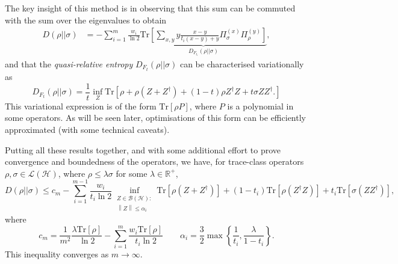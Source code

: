 \documentclass[10pt, a4paper]{article}
\numberwithin{equation}{section} %
\theoremstyle{definition}
\theoremstyle{plain}
\newcommand{\norm}[1]{\left\lVert#1\right\rVert}
\newcommand{\?}{\mathrel{?}} %
\newcommand{\R}{\mathbb{R}} %
\newcommand{\Tr}{\mathrm{Tr}} %
\newcommand{\Hs}{\mathcal{H}} %
\newcommand{\sB}{\mathcal{B}}
\begin{document}
      The key insight of this method is in observing that this sum can be commuted with the sum over the eigenvalues to obtain
      \begin{align}
        D(\rho||\sigma) &= - \sum_{i=1}^{m} \frac{w_i}{\ln 2} \underbrace{\Tr\left[ \sum_{x,y} y \frac{x-y}{t_i(x-y)+y} \Pi^{(x)}_{\sigma} \Pi^{(y)}_{\rho} \right]}_{D_{F_{t_i}}(\rho||\sigma)},
      \end{align}
      and that the \emph{quasi-relative entropy} \(D_{F_{t}}(\rho||\sigma)\) can be characterised variationally as
      \begin{equation}
        D_{F_{t}}(\rho||\sigma) = \frac{1}{t} \inf_Z \Tr\left[ \rho + \rho(Z + Z^{\dagger}) + (1-t)\rho{}Z^{\dagger}Z + t\sigma{}ZZ^{\dagger}. \right]
      \end{equation}
      This variational expression is of the form \(\Tr[\rho P]\), where \(P\) is a polynomial in some operators. As will be seen later, optimisations of this form can be efficiently approximated (with some technical caveats).

      Putting all these results together, and with some additional effort to prove convergence and boundedness of the operators, we have, for trace-class operators \(\rho, \sigma \in \mathcal{L}(\Hs)\), where \(\rho \leq \lambda\sigma\) for some \(\lambda \in \R^+\),
      \begin{equation}
        D(\rho||\sigma) \leq c_m - \sum_{i=1}^{m-1} \frac{w_i}{t_i \ln 2} \inf_{\substack{Z \in \sB(\Hs) : \\ \norm{Z} \leq \alpha_i}} \Tr\left[\rho\left(Z + Z^{\dagger}\right)\right] + (1-t_i)\Tr\left[\rho\left(Z^{\dagger}Z\right)\right] + t_i\Tr\left[\sigma\left(ZZ^{\dagger}\right)\right],
      \end{equation}
      where
      \begin{equation}
        c_m = \frac{1}{m^2} \frac{\lambda \Tr[\rho]}{\ln 2} - \sum_{i=1}^m \frac{w_i \Tr[\rho]}{t_i \ln 2} \qquad \alpha_i = \frac{3}{2} \max\left\{\frac{1}{t_i}, \frac{\lambda}{1-t_i}\right\}.
      \end{equation}
      This inequality converges as \(m \to \infty\).
\end{document}

